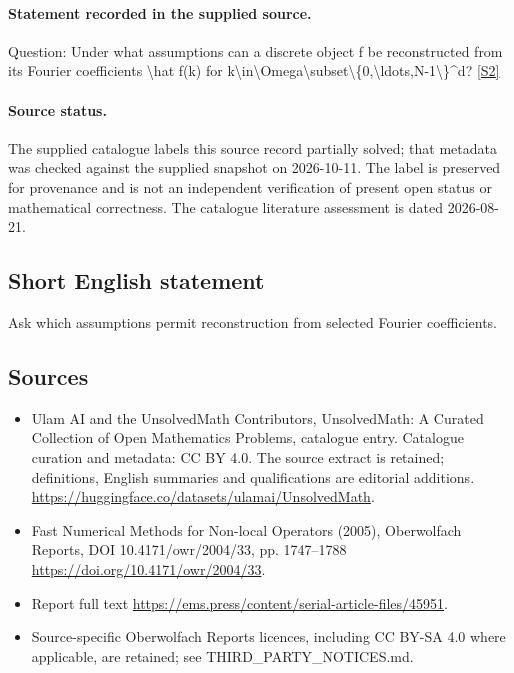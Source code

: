 \documentclass[11pt]{article}
\begin{document}
\paragraph{Statement recorded in the supplied source.}
Question: Under what assumptions can a discrete object f be reconstructed from its Fourier coefficients \textbackslash{}hat f(k) for k\textbackslash{}in\textbackslash{}Omega\textbackslash{}subset\textbackslash{}\{0,\textbackslash{}ldots,N-1\textbackslash{}\}\textasciicircum{}d? \href{https://doi.org/10.4171/owr/2004/33}{[S2]}
\paragraph{Source status.}
The supplied catalogue labels this source record partially solved; that metadata was checked against the supplied snapshot on 2026-10-11. The label is preserved for provenance and is not an independent verification of present open status or mathematical correctness. The catalogue literature assessment is dated 2026-08-21.
\subsection{Short English statement}
Ask which assumptions permit reconstruction from selected Fourier coefficients.
\subsection{Sources}
\begin{itemize}
\item[S1] Ulam AI and the UnsolvedMath Contributors, UnsolvedMath: A Curated Collection of Open Mathematics Problems, catalogue entry. Catalogue curation and metadata: CC BY 4.0. The source extract is retained; definitions, English summaries and qualifications are editorial additions.
\url{https://huggingface.co/datasets/ulamai/UnsolvedMath}.
\item[S2] Fast Numerical Methods for Non-local Operators (2005), Oberwolfach Reports, DOI 10.4171/owr/2004/33, pp. 1747--1788
\url{https://doi.org/10.4171/owr/2004/33}.
\item[S3] Report full text
\url{https://ems.press/content/serial-article-files/45951}.
\item Source-specific Oberwolfach Reports licences, including CC BY-SA 4.0 where applicable, are retained; see THIRD\_PARTY\_NOTICES.md.
\end{itemize}
\end{document}
